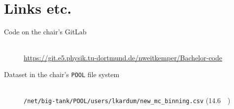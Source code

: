 \clearpage
\section{Links etc.}
\begin{description}
  \item[Code on the chair's GitLab] \hfill \\
    \url{https://git.e5.physik.tu-dortmund.de/nweitkemper/Bachelor-code}
  \item[Dataset in the chair's \texttt{POOL} file system] \hfill \\
    \texttt{/net/big-tank/POOL/users/lkardum/new\_mc\_binning.csv} (\SI{14.6}{\giga\byte})
\end{description}
